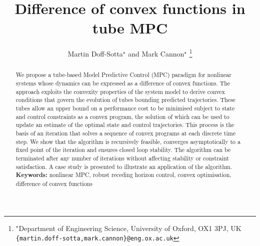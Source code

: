 \documentclass[a4paper, 10 pt, conference]{IEEEconf}
\title{\LARGE \bf
Difference of convex functions in tube MPC}
\author{Martin Doff-Sotta$^\star$
and
Mark Cannon$^\star$
\thanks{$^{\star}$Department of Engineering Science, University of Oxford, OX1 3PJ, UK
{\tt\small \{martin.doff-sotta,mark.cannon\}@eng.ox.ac.uk}}%
}%
\begin{document}
\maketitle
\pagestyle{plain}

\begin{abstract}
We propose a  tube-based Model Predictive Control (MPC) paradigm for nonlinear systems whose dynamics can be expressed as a difference of convex functions. 
%
The approach exploits the convexity properties of the system model to derive convex conditions that govern the evolution of tubes bounding predicted trajectories. 
%
These tubes allow an upper bound on a performance cost to be minimised subject to state and control constraints as a convex program, the solution of which can be used to update an estimate of the optimal state and control trajectories. 
%
This process is the basis of an iteration that solves a sequence of convex programs at each discrete time step. 
%
We show that the algorithm is recursively feasible, converges asymptotically to a fixed point of the iteration and ensures closed loop stability.
%
The algorithm can be terminated after any number of iterations without affecting stability or constraint satisfaction.
%
A case study is presented to illustrate an application of the algorithm. 
%
%
\\
\noindent\textbf{Keywords:}
nonlinear MPC, robust receding horizon control, convex optimisation, difference of convex functions
\end{abstract}
\end{document}
